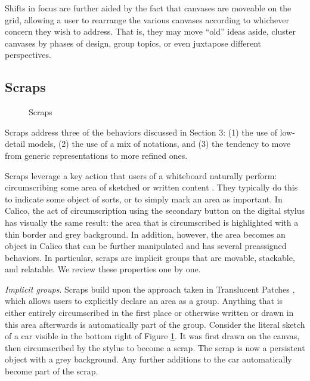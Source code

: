 Shifts in focus are further aided by the fact that canvases are moveable on the grid, allowing a user to rearrange the various canvases according to whichever concern they wish to address. That is, they may move ``old'' ideas aside, cluster canvases by phases of design, group topics, or even juxtapose different perspectives.

\subsection {Scraps}
\label{calico:3}

\begin{figure}
  \centering
 
\caption {Scraps}
\label{fig:5}       %
\end{figure}
%

Scraps address three of the behaviors discussed in Section 3: (1) the use of low-detail models, (2) the use of a mix of notations, and (3) the tendency to move from generic representations to more refined ones.

Scraps leverage a key action that users of a whiteboard naturally perform: circumscribing some area of sketched or written content \citep{Hendry}. They typically do this to indicate some object of sorts, or to simply mark an area as important. In Calico, the act of circumscription using the secondary button on the digital stylus has visually the same result: the area that is circumscribed is highlighted with a thin border and grey background. In addition, however, the area becomes an object in Calico that can be further manipulated and has several preassigned behaviors. In particular, scraps are implicit groups that are movable, stackable, and relatable. We review these properties one by one.

\emph{Implicit groups}. Scraps build upon the approach taken in Translucent Patches \citep{Kramer}, which allows users to explicitly declare an area as a group. Anything that is either entirely circumscribed in the first place or otherwise written or drawn in this area afterwards is automatically part of the group. Consider the literal sketch of a car visible in the bottom right of Figure \ref{fig:5}. It was first drawn on the canvas, then circumscribed by the stylus to become a scrap. The scrap is now a persistent object with a grey background. Any further additions to the car automatically become part of the scrap.

